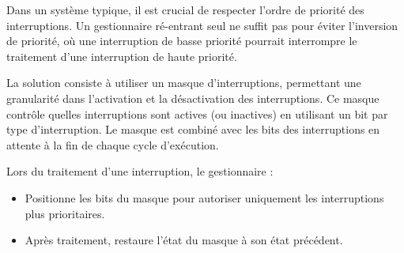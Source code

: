 Dans un système typique, il est crucial de respecter l'ordre de priorité des interruptions. Un gestionnaire ré-entrant seul ne suffit pas pour éviter l'inversion de priorité, où une interruption de basse priorité pourrait interrompre le traitement d'une interruption de haute priorité.

La solution consiste à utiliser un masque d'interruptions, permettant une granularité dans l'activation et la désactivation des interruptions. Ce masque contrôle quelles interruptions sont actives (ou inactives) en utilisant un bit par type d'interruption. Le masque est combiné avec les bits des interruptions en attente à la fin de chaque cycle d'exécution.

Lors du traitement d'une interruption, le gestionnaire :
\begin{itemize}
    \item Positionne les bits du masque pour autoriser uniquement les interruptions plus prioritaires.
    \item Après traitement, restaure l'état du masque à son état précédent.
\end{itemize}

